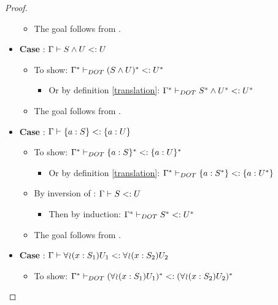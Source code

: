 \begin{proof}
\begin{itemize}
\begin{itemize}
            \item The goal follows from .
        \end{itemize}
        \item \textbf{Case} : $\Gamma \vdash S \wedge U <: U$
        \begin{itemize}
            \item To show:
                $\Gamma^{*} \vdash_{DOT} (S \wedge U)^{*} <: U^{*}$
            \begin{itemize}
                \item Or by definition \ref{translation}: $\Gamma^{*} \vdash_{DOT} S^{*} \wedge U^{*} <: U^{*}$
            \end{itemize}
            \item The goal follows from .
        \end{itemize}
        \item \textbf{Case} :
            $\Gamma \vdash \{a : S\} <: \{a : U\}$
        \begin{itemize}
            \item To show:
                $\Gamma^{*} \vdash_{DOT} \{a : S\}^{*} <: \{a : U\}^{*}$
            \begin{itemize}
                \item Or by definition \ref{translation}:
                    $\Gamma^{*} \vdash_{DOT} \{a : S^{*}\} <: \{a : U^{*}\}$
            \end{itemize}
            \item By inversion of : $\Gamma \vdash S <: U$
            \begin{itemize}
                \item Then by induction:
                    $\Gamma^{*} \vdash_{DOT} S^{*} <: U^{*}$
            \end{itemize}
            \item The goal follows from .
        \end{itemize}
        \item \textbf{Case} :
            $\Gamma \vdash \forall\!\wr\!(x:S_1)U_1 <: \forall\!\wr\!(x:S_2)U_2$
        \begin{itemize}
            \item To show: $\Gamma^{*} \vdash_{DOT} (\forall\!\wr\!(x:S_1)U_1)^{*} <: (\forall\!\wr\!(x:S_2)U_2)^{*}$
            \begin{itemize}

\end{itemize}
\end{itemize}
\end{itemize}
\end{proof}
